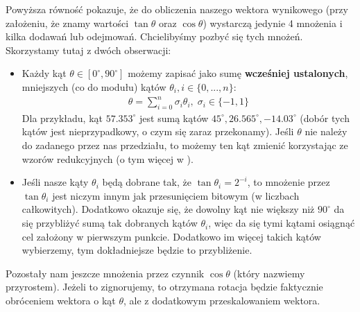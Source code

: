 \documentclass[12pt]{extarticle}
\theoremstyle{remark}
\theoremstyle{definition}
\theoremstyle{definition}
\begin{document}
Powyższa równość pokazuje, że do obliczenia naszego wektora wynikowego (przy założeniu, że znamy wartości $\tan\theta$ oraz $\cos\theta$) wystarczą jedynie 4 mnożenia i kilka dodawań lub odejmowań. Chcielibyśmy pozbyć się tych mnożeń. Skorzystamy tutaj z dwóch obserwacji:
\begin{itemize}
  \item Każdy kąt $\theta\in [0^{\circ}, 90^{\circ}]$ możemy zapisać jako sumę \textbf{wcześniej ustalonych}, mniejszych (co do modułu) kątów $\theta_i, i \in \{0, ..., n\}$:
        \begin{align}
          \theta = \sum_{i=0}^n \sigma_i\theta_i, \; \sigma_i \in \{-1, 1\}
        \end{align}
        Dla przykładu, kąt $57.353^{\circ}$ jest sumą kątów
        $45^{\circ}, 26.565^{\circ}, -14.03^{\circ}$ (dobór tych kątów jest nieprzypadkowy, o czym się zaraz przekonamy). Jeśli $\theta$ nie należy do zadanego przez nas przedziału, to możemy ten kąt zmienić korzystając ze wzorów redukcyjnych (o tym więcej w ).
  \item Jeśli nasze kąty $\theta_i$ będą dobrane tak, że $\tan\theta_i = 2^{-i}$, to mnożenie przez $\tan\theta_i$ jest niczym innym jak przesunięciem bitowym (w liczbach całkowitych). Dodatkowo okazuje się, że dowolny kąt nie większy niż $90^{\circ}$ da się przybliżyć sumą tak dobranych kątów $\theta_i$, więc da się tymi kątami osiągnąć cel założony w pierwszym punkcie. Dodatkowo im więcej takich kątów wybierzemy, tym dokładniejsze będzie to przybliżenie.
\end{itemize}

Pozostały nam jeszcze mnożenia przez czynnik $\cos\theta$ (który nazwiemy przyrostem). Jeżeli to zignorujemy, to otrzymana rotacja będzie faktycznie obróceniem wektora o kąt $\theta$, ale z dodatkowym przeskalowaniem wektora.

\end{document}

